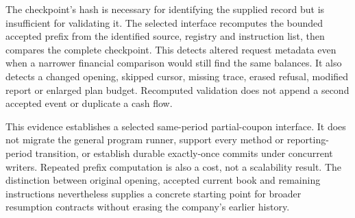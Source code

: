 The checkpoint's hash is necessary for identifying the supplied record but is insufficient for validating it. The selected interface recomputes the bounded accepted prefix from the identified source, registry and instruction list, then compares the complete checkpoint. This detects altered request metadata even when a narrower financial comparison would still find the same balances. It also detects a changed opening, skipped cursor, missing trace, erased refusal, modified report or enlarged plan budget. Recomputed validation does not append a second accepted event or duplicate a cash flow.

This evidence establishes a selected same-period partial-coupon interface. It does not migrate the general program runner, support every method or reporting-period transition, or establish durable exactly-once commits under concurrent writers. Repeated prefix computation is also a cost, not a scalability result. The distinction between original opening, accepted current book and remaining instructions nevertheless supplies a concrete starting point for broader resumption contracts without erasing the company's earlier history.
